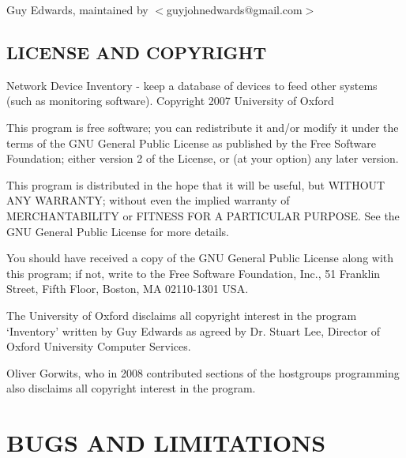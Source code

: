 \documentclass{book}
\begin{document}
Guy Edwards, maintained by $<$guyjohnedwards@gmail.com$>$


\subsection{LICENSE AND COPYRIGHT}
\label{Inventory::Models_LICENSE_AND_COPYRIGHT}
\hypertarget{Inventory::Models_LICENSE_AND_COPYRIGHT}{}



Network Device Inventory - keep a database of devices to feed other systems (such as monitoring software). Copyright 2007 University of Oxford



This program is free software; you can redistribute it and/or modify it under the terms of the GNU General Public License as published by the Free Software Foundation; either version 2 of the License, or (at your option) any later version.



This program is distributed in the hope that it will be useful, but WITHOUT ANY WARRANTY; without even the implied warranty of MERCHANTABILITY or FITNESS FOR A PARTICULAR PURPOSE. See the GNU General Public License for more details.



You should have received a copy of the GNU General Public License along with this program; if not, write to the Free Software Foundation, Inc., 51 Franklin Street, Fifth Floor, Boston, MA 02110-1301 USA.



The University of Oxford disclaims all copyright interest in the program `Inventory' written by Guy Edwards as agreed by Dr. Stuart Lee, Director of Oxford University Computer Services.



Oliver Gorwits, who in 2008 contributed sections of the hostgroups programming also disclaims all copyright interest in the program.




\section{BUGS AND LIMITATIONS}
\label{_BUGS_AND_LIMITATIONS}
\hypertarget{_BUGS_AND_LIMITATIONS}{}
\end{document}

